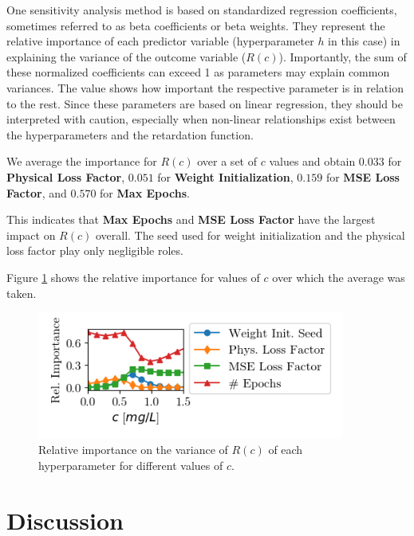 \documentclass{article}
\begin{document}
One sensitivity analysis method is based on standardized regression coefficients, sometimes referred to as beta coefficients or beta weights. They represent the relative importance of each predictor variable (hyperparameter $h$ in this case) in explaining the variance of the outcome variable ($R(c)$).
Importantly, the sum of these normalized coefficients can exceed 1 as parameters may explain common variances. The value shows how important the respective parameter is in relation to the rest.
Since these parameters are based on linear regression, they should be interpreted with caution, especially when non-linear relationships exist between the hyperparameters and the retardation function.

We average the importance for $R(c)$ over a set of $c$ values and obtain $0.033$ for \textbf{Physical Loss Factor}, $0.051$ for \textbf{Weight Initialization}, $0.159$ for \textbf{MSE Loss Factor}, and $0.570$ for \textbf{Max Epochs}.

This indicates that \textbf{Max Epochs} and \textbf{MSE Loss Factor} have the largest impact on $R(c)$ overall. The seed used for weight initialization and the physical loss factor play only negligible roles.

Figure \ref{fig:sensitivity} shows the relative importance for values of $c$ over which the average was taken.


\begin{figure}
    \centering
    \includegraphics[width=0.9\textwidth]{figs/sensitivity.png}
    \caption{Relative importance on the variance of $R(c)$ of each hyperparameter for different values of $c$.}
    \label{fig:sensitivity}
\end{figure}



\section{Discussion}
\end{document}
